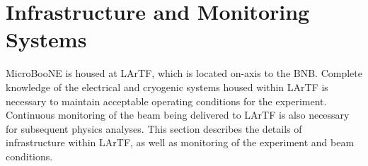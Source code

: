 \section{Infrastructure and Monitoring Systems}
\label{sec:slow-control}

MicroBooNE is housed at LArTF, which is located on-axis to the BNB.  Complete knowledge of the electrical and cryogenic systems housed within LArTF is necessary to maintain acceptable operating conditions for the experiment.  Continuous monitoring of the beam being delivered to LArTF is also necessary for subsequent physics analyses.  This section describes the details of infrastructure within LArTF, as well as monitoring of the experiment and beam conditions.

%
%
%
%
%

